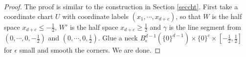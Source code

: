 \documentclass[10pt,a4paper]{amsart}
\newcommand{\cd}{\cdots}
\newcommand{\e}{\epsilon}
\newcommand{\ga}{\gamma}
\begin{document}
	\begin{proof}
		The proof is similar to the construction in Section \ref{seccht}. First take a coordinate chart $U$ with coordinate labels $(x_1,\cd,x_{d+c})$, so that $W$ is the half space $x_{d+c}\le -\frac{1}{2}$, $W'$ is the half space $x_{d+c}\ge \frac{1}{2}$ and $\ga$ is the line segment from $(0,\cd,0,-\frac{1}{2})$ and $(0,\cd,0,\frac{1}{2}).$ Glue a neck $B_\e^{d-1}(\{0\}^{d-1})\times\{0\}^c\times [-\frac{1}{2},\frac{1}{2}]$ for $\e$ small and smooth the corners. We are done.
	\end{proof}
\end{document}
